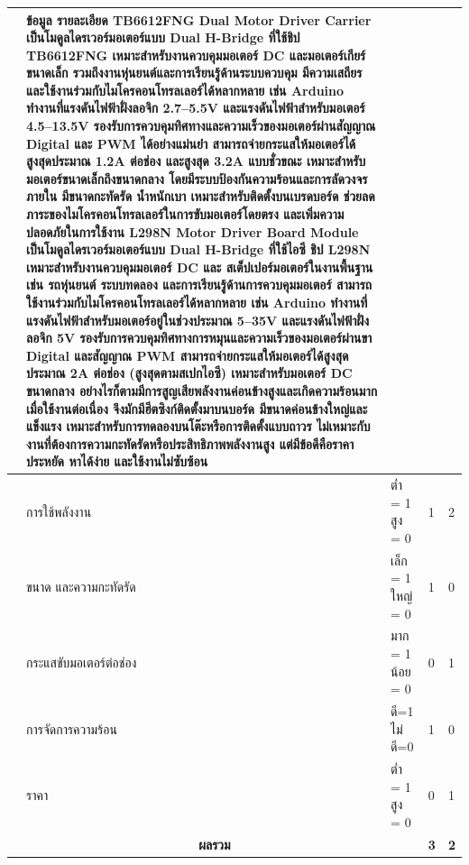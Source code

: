 \documentclass[14pt, fleqn, a4paper]{extarticle}
\begin{document}
\begin{enumerate}
\begin{enumerate}
\begin{table}[H]
\begin{tabular}{|p{1cm}|p{2cm}|p{1.75cm}|p{5cm}|p{5cm}|}
{			} 
			& \multicolumn{1}{p{5cm}|}{
ข้อมูล
รายละเอียด
 	TB6612FNG Dual Motor Driver Carrier เป็นโมดูลไดรเวอร์มอเตอร์แบบ Dual H-Bridge ที่ใช้ชิป TB6612FNG เหมาะสำหรับงานควบคุมมอเตอร์ DC และมอเตอร์เกียร์ขนาดเล็ก รวมถึงงานหุ่นยนต์และการเรียนรู้ด้านระบบควบคุม มีความเสถียรและใช้งานร่วมกับไมโครคอนโทรลเลอร์ได้หลากหลาย เช่น Arduino
ทำงานที่แรงดันไฟฟ้าฝั่งลอจิก 2.7–5.5V และแรงดันไฟฟ้าสำหรับมอเตอร์ 4.5–13.5V รองรับการควบคุมทิศทางและความเร็วของมอเตอร์ผ่านสัญญาณ Digital และ PWM ได้อย่างแม่นยำ
สามารถจ่ายกระแสให้มอเตอร์ได้สูงสุดประมาณ 1.2A ต่อช่อง และสูงสุด 3.2A แบบชั่วขณะ เหมาะสำหรับมอเตอร์ขนาดเล็กถึงขนาดกลาง โดยมีระบบป้องกันความร้อนและการลัดวงจรภายใน
มีขนาดกะทัดรัด น้ำหนักเบา เหมาะสำหรับติดตั้งบนเบรดบอร์ด ช่วยลดภาระของไมโครคอนโทรลเลอร์ในการขับมอเตอร์โดยตรง และเพิ่มความปลอดภัยในการใช้งาน
	L298N Motor Driver Board Module เป็นโมดูลไดรเวอร์มอเตอร์แบบ Dual H-Bridge ที่ใช้ไอซี ชิป L298N เหมาะสำหรับงานควบคุมมอเตอร์ DC และ
สเต็ปเปอร์มอเตอร์ในงานพื้นฐาน เช่น รถหุ่นยนต์ ระบบทดลอง และการเรียนรู้ด้านการควบคุมมอเตอร์ สามารถใช้งานร่วมกับไมโครคอนโทรลเลอร์ได้หลากหลาย เช่น Arduino
ทำงานที่แรงดันไฟฟ้าสำหรับมอเตอร์อยู่ในช่วงประมาณ 5–35V และแรงดันไฟฟ้าฝั่งลอจิก 5V รองรับการควบคุมทิศทางการหมุนและความเร็วของมอเตอร์ผ่านขา Digital และสัญญาณ PWM
สามารถจ่ายกระแสให้มอเตอร์ได้สูงสุดประมาณ 2A ต่อช่อง (สูงสุดตามสเปกไอซี) เหมาะสำหรับมอเตอร์ DC ขนาดกลาง อย่างไรก็ตามมีการสูญเสียพลังงานค่อนข้างสูงและเกิดความร้อนมากเมื่อใช้งานต่อเนื่อง จึงมักมีฮีตซิงก์ติดตั้งมาบนบอร์ด
มีขนาดค่อนข้างใหญ่และแข็งแรง เหมาะสำหรับการทดลองบนโต๊ะหรือการติดตั้งแบบถาวร ไม่เหมาะกับงานที่ต้องการความกะทัดรัดหรือประสิทธิภาพพลังงานสูง แต่มีข้อดีคือราคาประหยัด หาได้ง่าย และใช้งานไม่ซับซ้อน
			}
			\\ \hline

			\multirow{5}{*}{\rotatebox{90}{\parbox{3cm}{\centering\textbf{เกณฑ์การพิจารณา}}}}
			& การใช้พลังงาน
 & ต่ำ = 1 สูง = 0
			& 1 & 2 \\ \cline{2-5}

			& ขนาด
และความกะทัดรัด
 & เล็ก = 1 ใหญ่ = 0
			& 1 & 0 \\ \cline{2-5}

			& กระแสขับมอเตอร์ต่อช่อง & มาก = 1 น้อย = 0
			& 0 & 1 \\ \cline{2-5}

			& การจัดการความร้อน & ดี=1
ไม่ดี=0
			& 1 & 0 \\ \cline{2-5}

			& ราคา & ต่ำ = 1 สูง = 0
			& 0 & 1 \\ \hline

			\multicolumn{3}{|c|}{\textbf{ผลรวม}} & \textbf{3} & \textbf{2} \\ \hline


\end{tabular}
\end{table}
\end{enumerate}
\end{enumerate}
\end{document}
